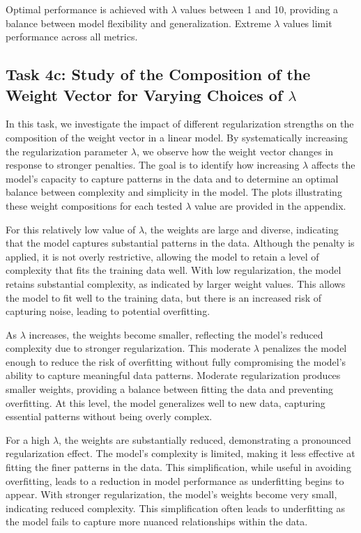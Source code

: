 \documentclass[a4paper,oneside,bibliography=totoc]{scrartcl}
\begin{document}
Optimal performance is achieved with $\lambda$ values between 1 and 10, providing a balance between model flexibility and generalization. Extreme $\lambda$ values limit performance across all metrics.

\subsection{Task 4c: Study of the Composition of the Weight Vector for Varying Choices of $\lambda$}

In this task, we investigate the impact of different regularization strengths on the composition of the weight vector in a linear model. By systematically increasing the regularization parameter $\lambda$, we observe how the weight vector changes in response to stronger penalties. The goal is to identify how increasing $\lambda$ affects the model's capacity to capture patterns in the data and to determine an optimal balance between complexity and simplicity in the model. The plots illustrating these weight compositions for each tested $\lambda$ value are provided in the appendix.

For this relatively low value of $\lambda$, the weights are large and diverse, indicating that the model captures substantial patterns in the data. Although the penalty is applied, it is not overly restrictive, allowing the model to retain a level of complexity that fits the training data well. With low regularization, the model retains substantial complexity, as indicated by larger weight values. This allows the model to fit well to the training data, but there is an increased risk of capturing noise, leading to potential overfitting.

As $\lambda$ increases, the weights become smaller, reflecting the model's reduced complexity due to stronger regularization. This moderate $\lambda$ penalizes the model enough to reduce the risk of overfitting without fully compromising the model's ability to capture meaningful data patterns. Moderate regularization produces smaller weights, providing a balance between fitting the data and preventing overfitting. At this level, the model generalizes well to new data, capturing essential patterns without being overly complex.

For a high $\lambda$, the weights are substantially reduced, demonstrating a pronounced regularization effect. The model’s complexity is limited, making it less effective at fitting the finer patterns in the data. This simplification, while useful in avoiding overfitting, leads to a reduction in model performance as underfitting begins to appear. With stronger regularization, the model’s weights become very small, indicating reduced complexity. This simplification often leads to underfitting as the model fails to capture more nuanced relationships within the data.
\end{document}
